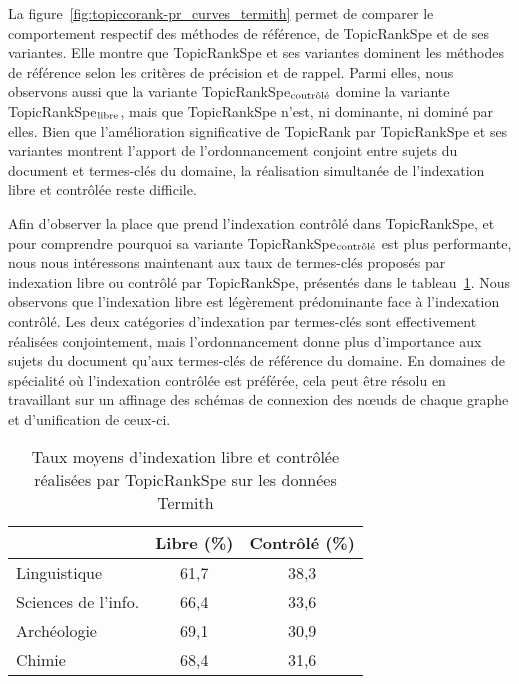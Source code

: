   La figure~\ref{fig:topiccorank-pr_curves_termith} permet de comparer le
  comportement respectif des méthodes de référence, de Topic\-RankSpe et de
  ses variantes. Elle montre que TopicRankSpe et ses variantes dominent les
  méthodes de référence selon les critères de précision
  et de rappel. Parmi elles, nous observons aussi que la variante
  TopicRankSpe$_\textnormal{contrôlé}$ domine la variante
  TopicRankSpe$_\textnormal{libre}$, mais que TopicRankSpe n'est, ni
  dominante, ni dominé par elles. Bien que l'amélioration significative de
  TopicRank par TopicRankSpe et ses variantes montrent l'apport de
  l'ordonnancement conjoint entre sujets du document et termes-clés du
  domaine, la réalisation simultanée de l'indexation libre et contrôlée
  reste difficile.
  

  Afin d'observer la place que prend l'indexation contrôlé dans TopicRankSpe, et
  pour comprendre pourquoi sa variante TopicRankSpe$_\textnormal{contrôlé}$
  est plus performante, nous nous intéressons maintenant aux taux de
  termes-clés proposés par indexation libre ou contrôlé par TopicRankSpe, présentés dans le
  tableau~\ref{tab:assignment_ratio_termith}. Nous observons que
  l'indexation libre est légèrement prédominante face à l'indexation contrôlé. Les deux
  catégories d'indexation par termes-clés sont effectivement réalisées
  conjointement, mais l'ordonnancement donne plus d'importance aux sujets
  du document qu'aux termes-clés de référence du domaine. En domaines de
  spécialité où l'indexation contrôlée est préférée, cela peut être résolu en
  travaillant sur un affinage des schémas de connexion des n\oe{}uds de
  chaque graphe et d'unification de ceux-ci.
  \begin{table}
    \centering
    \begin{tabular}{l|c|c}
        \toprule
        & Libre (\%) & Contrôlé (\%)\\
        \hline
        Linguistique & 61,7 & 38,3\\
        Sciences de l'info. & 66,4 & 33,6\\
        Archéologie & 69,1 & 30,9\\
        Chimie & 68,4 & 31,6\\
        \bottomrule
    \end{tabular}
    \caption{Taux moyens d'indexation libre et contrôlée réalisées par
             TopicRankSpe sur les données Termith
             \label{tab:assignment_ratio_termith}}
  \end{table}

